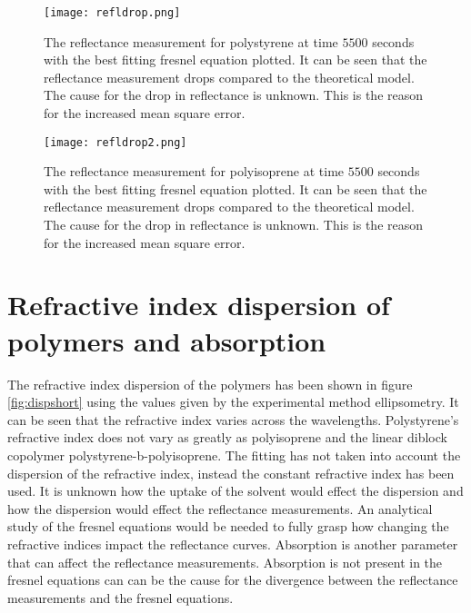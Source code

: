 \documentclass[MasterThesisMain.tex]{subfiles}
\begin{document}
\begin{figure}[H]
\centering
\texttt{[image: refldrop.png]}
\caption{The reflectance measurement for polystyrene at time $5500$ seconds with the best fitting fresnel equation plotted. It can be seen that the reflectance measurement drops compared to the theoretical model. The cause for the drop in reflectance is unknown. This is the reason for the increased mean square error.}
\label{fig:drop}
\end{figure}

\begin{figure}[H]
\centering
\texttt{[image: refldrop2.png]}
\caption{The reflectance measurement for polyisoprene at time $5500$ seconds with the best fitting fresnel equation plotted. It can be seen that the reflectance measurement drops compared to the theoretical model. The cause for the drop in reflectance is unknown. This is the reason for the increased mean square error.}
\label{fig:drop2}
\end{figure}

\section{Refractive index dispersion of polymers and absorption}
The refractive index dispersion of the polymers has been shown in figure \ref{fig:dispshort} using the values given by the experimental method ellipsometry. It can be seen that the refractive index varies across the wavelengths. Polystyrene's refractive index does not vary as greatly as polyisoprene and the linear diblock copolymer polystyrene-b-polyisoprene. The fitting has not taken into account the dispersion of the refractive index, instead the constant refractive index has been used. It is unknown how the uptake of the solvent would effect the dispersion and how the dispersion would effect the reflectance measurements. An analytical study of the fresnel equations would be needed to fully grasp how changing the refractive indices impact the reflectance curves. Absorption is another parameter that can affect the reflectance measurements. Absorption is not present in the fresnel equations can can be the cause for the divergence between the reflectance measurements and the fresnel equations. 
\end{document}
